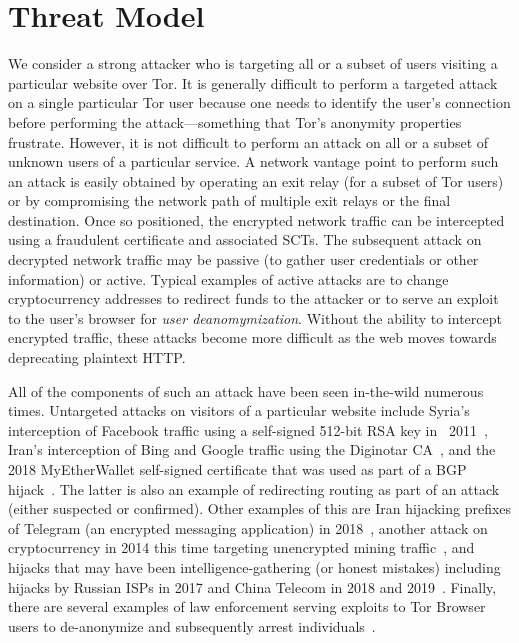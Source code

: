 \section{Threat Model} \label{sec:adversary}

We consider a strong attacker who is targeting all or a subset of users visiting
a particular website over Tor. It is generally difficult to perform a targeted
attack on a single particular Tor user because one needs to identify the user's
connection before performing the attack---something that Tor's
anonymity properties frustrate.
However, it is not difficult to perform an attack on all or a subset of unknown
users of a particular service. A network vantage point to perform such an attack
is easily obtained by operating an exit relay (for a subset of Tor users) or by
compromising the network path of multiple exit relays or the final destination.
Once so positioned, the encrypted network traffic can be intercepted using a
fraudulent certificate and associated SCTs.  The subsequent attack on decrypted
network traffic
may be passive (to gather user credentials or other information) or active.
Typical examples of active attacks are to change cryptocurrency addresses to
redirect funds to the attacker or to serve an exploit to the user's browser for
\emph{user deanomymization}. Without the ability to intercept encrypted traffic,
these attacks become more difficult as the web moves towards deprecating
plaintext HTTP.

All of the components of such an attack have been seen in-the-wild
numerous times. Untargeted attacks on visitors of a particular website
include Syria's interception of Facebook traffic using a self-signed
512-bit RSA key in ~2011~\cite{syria-facebook-mitm}, Iran's
interception of Bing and Google traffic using the Diginotar
CA~\cite{diginotar,ct/a}, and the 2018 MyEtherWallet
self-signed certificate that was used as part of a BGP
hijack~\cite{ethereum-hijack-isoc}.  The latter is also an example of
redirecting routing as part of an attack (either suspected or
confirmed). Other examples of this are Iran hijacking prefixes of
Telegram (an encrypted messaging application) in
2018~\cite{iran-telegram-bgp}, another attack on cryptocurrency in
2014 this time targeting unencrypted mining
traffic~\cite{bgp-hijacking-for-crypto},
and hijacks that may have been intelligence-gathering (or honest
mistakes) including hijacks by Russian ISPs in 2017 and China Telecom
in 2018 and 2019~\cite{wiki-bgp}.  Finally, there are several examples of 
law enforcement serving exploits to Tor Browser users to de-anonymize and
subsequently arrest individuals~\cite{forbes-fbi-tor,doj-fbi-tor}.

